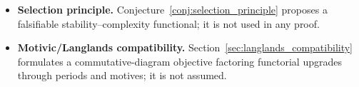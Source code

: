 \begin{itemize}
\item \textbf{Selection principle.} Conjecture~\ref{conj:selection_principle} proposes a falsifiable stability--complexity functional; it is not used in any proof.
\item \textbf{Motivic/Langlands compatibility.} Section~\ref{sec:langlands_compatibility} formulates a commutative-diagram objective factoring functorial upgrades through periods and motives; it is not assumed.
\end{itemize}


